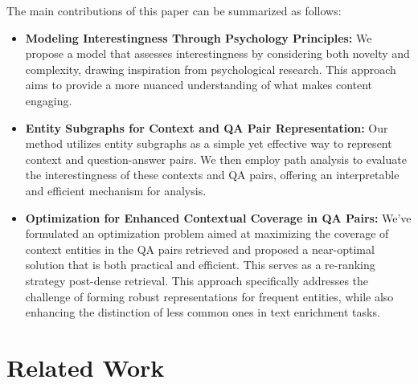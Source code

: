 \documentclass[11pt]{article}
\begin{document}
The main contributions of this paper can be summarized as follows:
\begin{itemize}
    \item \textbf{Modeling Interestingness Through Psychology Principles:} We propose a model that assesses interestingness by considering both novelty and complexity, drawing inspiration from psychological research. This approach aims to provide a more nuanced understanding of what makes content engaging.
    \item \textbf{Entity Subgraphs for Context and QA Pair Representation:} Our method utilizes entity subgraphs as a simple yet effective way to represent context and question-answer pairs. We then employ path analysis to evaluate the interestingness of these contexts and QA pairs, offering an interpretable and efficient mechanism for analysis.
    \item \textbf{Optimization for Enhanced Contextual Coverage in QA Pairs:} We've formulated an optimization problem aimed at maximizing the coverage of context entities in the QA pairs retrieved and proposed a near-optimal solution that is both practical and efficient. This serves as a re-ranking strategy post-dense retrieval. This approach specifically addresses the challenge of forming robust representations for frequent entities, while also enhancing the distinction of less common ones in text enrichment tasks.
\end{itemize}

% 
\section{Related Work}
\end{document}
